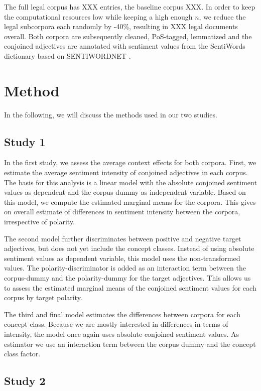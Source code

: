 \documentclass{article}
\begin{document}
The full legal corpus has XXX entries, the baseline corpus XXX. In order to keep the computational resources low while keeping a high enough $n$, we reduce the legal subcorpora each randomly by -40\%, resulting in XXX legal documents overall. Both corpora are subsequently cleaned, PoS-tagged, lemmatized and the conjoined adjectives are annotated with sentiment values from the SentiWords dictionary based on SENTIWORDNET \citep{Esuli2006, Baccianella2010, Guerini2013, Gatti2016}.

\section{Method}

In the following, we will discuss the methods used in our two studies.

\subsection{Study 1}

In the first study, we assess the average context effects for both corpora. First, we estimate the average sentiment intensity of conjoined adjectives in each corpus. The basis for this analysis is a linear model with the absolute conjoined sentiment values as dependent and the corpus-dummy as independent variable. Based on this model, we compute the estimated marginal means for the corpora. This gives on overall estimate of differences in sentiment intensity between the corpora, irrespective of polarity. 

The second model further discriminates between positive and negative target adjectives, but does not yet include the concept classes. Instead of using absolute sentiment values as dependent variable, this model uses the non-transformed values. The polarity-discriminator is added as an interaction term between the corpus-dummy and the polarity-dummy for the target adjectives. This allows us to assess the estimated marginal means of the conjoined sentiment values for each corpus by target polarity.

The third and final model estimates the differences between corpora for each concept class. Because we are mostly interested in differences in terms of intensity, the model once again uses absolute conjoined sentiment values. As estimator we use an interaction term between the corpus dummy and the concept class factor.

\subsection{Study 2}
\end{document}
